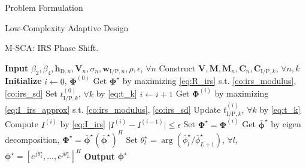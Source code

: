 \documentclass[journal]{IEEEtran}
\begin{document}
\begin{section}{Problem Formulation}
\begin{subsection}{Low-Complexity Adaptive Design}
			\begin{algorithm}[!t]
				\caption{M-SCA: IRS Phase Shift.}
				\label{al:m_sca}
				\begin{algorithmic}[1]
					\State \textbf{Input} $\beta_2,\beta_4,\boldsymbol{h}_{\mathrm{D},n},\boldsymbol{V}_{n},\sigma_n,\boldsymbol{w}_{\mathrm{I/P},n},\rho,\epsilon$, $\forall n$
					\State Construct $\boldsymbol{V},\boldsymbol{M},\boldsymbol{M}_n,\boldsymbol{C}_{n},\boldsymbol{C}_{\mathrm{I/P},k}$, $\forall n,k$
					\State \textbf{Initialize} $i \gets 0$, $\boldsymbol{\Phi}^{(0)}$
						\State Get $\boldsymbol{\Phi}^{\star}$ by maximizing \eqref{eq:R_irs} s.t. \eqref{co:irs_modulus}, \eqref{co:irs_sd}
					\Else
						\State Set $t_{\mathrm{I/P},k}^{(0)}$, $\forall k$ by \eqref{eq:t_k}
						\Repeat
							\State $i \gets i + 1$
								\State Get $\boldsymbol{\Phi}^{(i)}$ by maximizing \eqref{eq:I_irs_approx} s.t. \eqref{co:irs_modulus}, \eqref{co:irs_sd}
								\State Update $t_{\mathrm{I/P},k}^{(i)}$, $\forall k$ by \eqref{eq:t_k}
								\State Compute $I^{(i)}$ by \eqref{eq:I_irs}
						\Until $\lvert I^{(i)}-I^{(i-1)} \rvert \le \epsilon$
						\State Set $\boldsymbol{\Phi}^{\star}=\boldsymbol{\Phi}^{(i)}$
					\EndIf
					\State Get $\bar{\boldsymbol{\phi}}^\star$ by eigen decomposition, $\boldsymbol{\Phi}^{\star}=\bar{\boldsymbol{\phi}}^\star(\bar{\boldsymbol{\phi}}^\star)^H$
					\State Set $\theta_l^\star=\arg(\bar{\phi}_l^\star/\bar{\phi}_{L+1}^\star)$, $\forall l$, $\boldsymbol{\phi}^{\star}=[e^{j\theta_1^\star},\dots,e^{j\theta_L^\star}]^H$
					\State \textbf{Output} $\boldsymbol{\phi}^{\star}$
				\end{algorithmic}
			\end{algorithm}
		\end{subsection}



\end{section}
\end{document}
